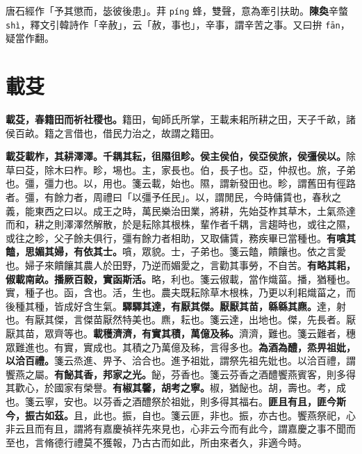 \begin{quoting}唐石經作「予其懲而，毖彼後患」。荓 \texttt{píng} 蜂，雙聲，意為牽引扶助。\textbf{陳奐}辛螫 \texttt{shì}，釋文引韓詩作「辛赦」，云「赦，事也」，辛事，謂辛苦之事。又曰拚 \texttt{fān}，疑當作翻。\end{quoting}

\section{載芟}


\textbf{載芟，春籍田而祈社稷也。}{\footnotesize 籍田，甸師氏所掌，王載耒耜所耕之田，天子千畝，諸侯百畝。籍之言借也，借民力治之，故謂之籍田。}

\textbf{載芟載柞，其耕澤澤。千耦其耘，徂隰徂畛。侯主侯伯，侯亞侯旅，侯彊侯以。}{\footnotesize 除草曰芟，除木曰柞。畛，埸也。主，家長也。伯，長子也。亞，仲叔也。旅，子弟也。彊，彊力也。以，用也。箋云載，始也。隰，謂新發田也。畛，謂舊田有徑路者。彊，有餘力者，周禮曰「以彊予任民」。以，謂閒民，今時傭賃也，春秋之義，能東西之曰以。成王之時，萬民樂治田業，將耕，先始芟柞其草木，土氣烝達而和，耕之則澤澤然解散，於是耘除其根株，輩作者千耦，言趨時也，或往之隰，或往之畛，父子餘夫俱行，彊有餘力者相助，又取傭賃，務疾畢已當種也。}\textbf{有嗿其饁，思媚其婦，有依其士。}{\footnotesize 嗿，眾貌。士，子弟也。箋云饁，饋饟也。依之言愛也。婦子來饋饟其農人於田野，乃逆而媚愛之，言勸其事勞，不自苦。}\textbf{有略其耜，俶載南畝。播厥百穀，實函斯活。}{\footnotesize 略，利也。箋云俶載，當作熾菑。播，猶種也。實，種子也。函，含也。活，生也。農夫既耘除草木根株，乃更以利耜熾菑之，而後種其種，皆成好含生氣。}\textbf{驛驛其達，有厭其傑。厭厭其苗，緜緜其麃。}{\footnotesize 達，射也。有厭其傑，言傑苗厭然特美也。麃，耘也。箋云達，出地也。傑，先長者。厭厭其苗，眾齊等也。}\textbf{載穫濟濟，有實其積，萬億及秭。}{\footnotesize 濟濟，難也。箋云難者，穗眾難進也。有實，實成也。其積之乃萬億及秭，言得多也。}\textbf{為酒為醴，烝畀祖妣，以洽百禮。}{\footnotesize 箋云烝進、畀予、洽合也。進予祖妣，謂祭先祖先妣也。以洽百禮，謂饗燕之屬。}\textbf{有飶其香，邦家之光。}{\footnotesize 飶，芬香也。箋云芬香之酒醴饗燕賓客，則多得其歡心，於國家有榮譽。}\textbf{有椒其馨，胡考之寧。}{\footnotesize 椒，猶飶也。胡，壽也。考，成也。箋云寧，安也。以芬香之酒醴祭於祖妣，則多得其福右。}\textbf{匪且有且，匪今斯今，振古如茲。}{\footnotesize 且，此也。振，自也。箋云匪，非也。振，亦古也。饗燕祭祀，心非云且而有且，謂將有嘉慶禎祥先來見也，心非云今而有此今，謂嘉慶之事不聞而至也，言脩德行禮莫不獲報，乃古古而如此，所由來者久，非適今時。}

